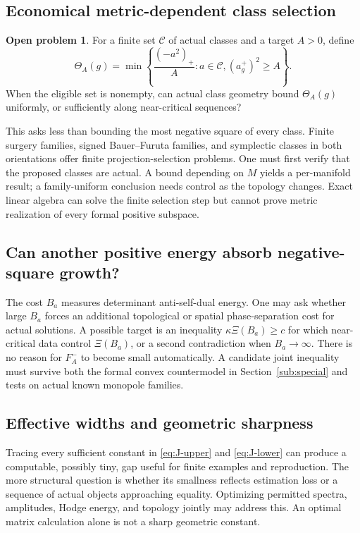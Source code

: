 \documentclass[11pt,a4paper]{article}
\theoremstyle{definition}
\newtheorem{problem}[theorem]{Open problem}
\theoremstyle{remark}
\numberwithin{equation}{section}
\begin{document}
\subsection{Economical metric-dependent class selection}\label{sub:class-selection}
\begin{problem}\label{prob:selection}
For a finite set $\mathscr C$ of actual classes and a target $A>0$, define
\begin{equation}\label{eq:Theta}
 \Theta_A(g)=\min\left\{\frac{(-a^2)_+}{A}:a\in\mathscr C,
                                      (a_g^+)^2\ge A\right\}.
\end{equation}
When the eligible set is nonempty, can actual class geometry bound
$\Theta_A(g)$ uniformly, or sufficiently along near-critical sequences?
\end{problem}
This asks less than bounding the most negative square of every class.
Finite surgery families, signed Bauer--Furuta families, and symplectic
classes in both orientations offer finite projection-selection problems.
One must first verify that the proposed classes are actual. A bound
depending on $M$ yields a per-manifold result; a family-uniform conclusion
needs control as the topology changes. Exact linear algebra can solve
the finite selection step but cannot prove metric realization of every
formal positive subspace.

\subsection{Can another positive energy absorb negative-square growth?}\label{sub:cost-compensation}
The cost $B_a$ measures determinant anti-self-dual energy. One may ask
whether large $B_a$ forces an additional topological or spatial
phase-separation cost for actual solutions. A possible target is an
inequality $\kappa\Xi(B_a)\ge c$ for which near-critical data control
$\Xi(B_a)$, or a second contradiction when $B_a\to\infty$.
There is no reason for $F_A^-$ to become small automatically. A candidate
joint inequality must survive both the formal convex countermodel in
Section~\ref{sub:special} and tests on actual known monopole families.

\subsection{Effective widths and geometric sharpness}\label{sub:effective-constants}
Tracing every sufficient constant in \eqref{eq:J-upper} and
\eqref{eq:J-lower} can produce a computable, possibly tiny, gap useful
for finite examples and reproduction. The more structural question is
whether its smallness reflects estimation loss or a sequence of actual
objects approaching equality. Optimizing permitted spectra, amplitudes,
Hodge energy, and topology jointly may address this. An optimal matrix
calculation alone is not a sharp geometric constant.
\end{document}

